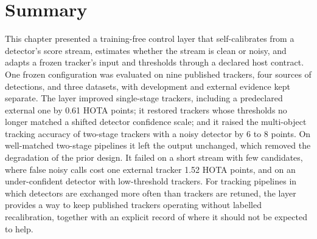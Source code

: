 \section{Summary}\label{sec:ch5-conclusions}
This chapter presented a training-free control layer that self-calibrates from a detector's score stream, estimates whether the stream is clean or noisy, and adapts a frozen tracker's input and thresholds through a declared host contract. One frozen configuration was evaluated on nine published trackers, four sources of detections, and three datasets, with development and external evidence kept separate. The layer improved single-stage trackers, including a predeclared external one by 0.61 HOTA points; it restored trackers whose thresholds no longer matched a shifted detector confidence scale; and it raised the multi-object tracking accuracy of two-stage trackers with a noisy detector by 6 to 8 points. On well-matched two-stage pipelines it left the output unchanged, which removed the degradation of the prior design. It failed on a short stream with few candidates, where false noisy calls cost one external tracker 1.52 HOTA points, and on an under-confident detector with low-threshold trackers. For tracking pipelines in which detectors are exchanged more often than trackers are retuned, the layer provides a way to keep published trackers operating without labelled recalibration, together with an explicit record of where it should not be expected to help.

